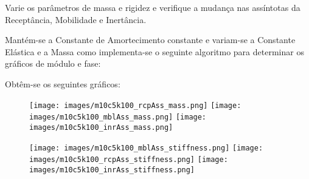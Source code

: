 \documentclass{article}
\begin{document}
\newpage
\begin{exercise}\label{ex7}
    Varie os parâmetros de massa e rigidez e verifique a mudança nas assíntotas da Receptância, Mobilidade e Inertância.
\end{exercise}
\begin{resolution}
    \noindent Mantém-se a Constante de Amortecimento constante e variam-se a Constante Elástica e a Massa como implementa-se o seguinte algoritmo para determinar os gráficos de módulo e fase:
    \begin{scriptsize}
        \myMatlab
    \end{scriptsize}
    Obtêm-se os seguintes gráficos:
    \begin{figure}[H]
        \centering
        \texttt{[image: images/m10c5k100\_rcpAss\_mass.png]}
        \texttt{[image: images/m10c5k100\_mblAss\_mass.png]}
        \texttt{[image: images/m10c5k100\_inrAss\_mass.png]}
    \end{figure}
    \begin{figure}[H]
        \centering
        \texttt{[image: images/m10c5k100\_mblAss\_stiffness.png]}
        \texttt{[image: images/m10c5k100\_rcpAss\_stiffness.png]}
        \texttt{[image: images/m10c5k100\_inrAss\_stiffness.png]}
    \end{figure}
\end{resolution}
\end{document}
